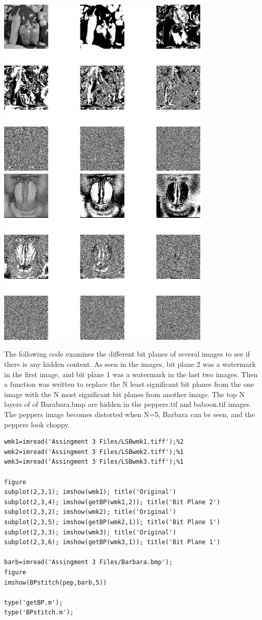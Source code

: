 \documentclass{article}
\begin{document}
\includegraphics [width=4in]{lab3_01.eps}
\includegraphics [width=4in]{lab3_02.eps}

The following code examines the different bit planes of several images to
see if there is any hidden content. As seen in the images, bit plane 2 was a
watermark in the first image, and bit plane 1 was a watermark in the last
two images. Then a function was written to replace the N least significant
bit planes from the one image with the N most significant bit planes from
another image. The top N layers of of Barabara.bmp are hidden in the
peppers.tif and baboon.tif images. The peppers image becomes distorted when
N=5, Barbara can be seen, and the peppers look choppy. 

\begin{lstlisting}
wmk1=imread('Assingment 3 Files/LSBwmk1.tiff');%2
wmk2=imread('Assingment 3 Files/LSBwmk2.tiff');%1
wmk3=imread('Assingment 3 Files/LSBwmk3.tiff');%1

figure
subplot(2,3,1); imshow(wmk1); title('Original')
subplot(2,3,4); imshow(getBP(wmk1,2)); title('Bit Plane 2')
subplot(2,3,2); imshow(wmk2); title('Original')
subplot(2,3,5); imshow(getBP(wmk2,1)); title('Bit Plane 1')
subplot(2,3,3); imshow(wmk3); title('Original')
subplot(2,3,6); imshow(getBP(wmk3,1)); title('Bit Plane 1')

barb=imread('Assingment 3 Files/Barbara.bmp');
figure
imshow(BPstitch(pep,barb,5))

type('getBP.m');
type('BPstitch.m');

\end{lstlisting}
\end{document}
